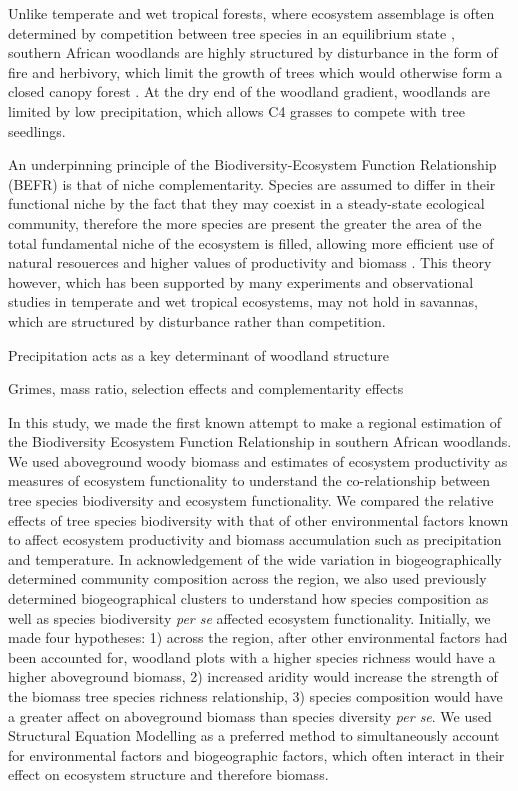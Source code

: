 \documentclass[11pt,a4paper]{article}
\begin{document}
Unlike temperate and wet tropical forests, where ecosystem assemblage is often determined by competition between tree species in an equilibrium state \citep{}, southern African woodlands are highly structured by disturbance in the form of fire and herbivory, which limit the growth of trees which would otherwise form a closed canopy forest \citep{}. At the dry end of the woodland gradient, woodlands are limited by low precipitation, which allows C4 grasses to compete with tree seedlings.

An underpinning principle of the Biodiversity-Ecosystem Function Relationship (BEFR) is that of niche complementarity. Species are assumed to differ in their functional niche by the fact that they may coexist in a steady-state ecological community, therefore the more species are present the greater the area of the total fundamental niche of the ecosystem is filled, allowing more efficient use of natural resouerces and higher values of productivity and biomass \citep{}. This theory however, which has been supported by many experiments and observational studies in temperate and wet tropical ecosystems, may not hold in savannas, which are structured by disturbance rather than competition.

Precipitation acts as a key determinant of woodland structure

Grimes, mass ratio, selection effects and complementarity effects 

In this study, we made the first known attempt to make a regional estimation of the Biodiversity Ecosystem Function Relationship in southern African woodlands. We used aboveground woody biomass and estimates of ecosystem productivity as measures of ecosystem functionality to understand the co-relationship between tree species biodiversity and ecosystem functionality. We compared the relative effects of tree species biodiversity with that of other environmental factors known to affect ecosystem productivity and biomass accumulation such as precipitation and temperature. In acknowledgement of the wide variation in biogeographically determined community composition across the region, we also used previously determined biogeographical clusters \citep{} to understand how species composition as well as species biodiversity \textit{per se} affected ecosystem functionality. Initially, we made four hypotheses: 1) across the region, after other environmental factors had been accounted for, woodland plots with a higher species richness would have a higher aboveground biomass, 2) increased aridity would increase the strength of the biomass tree species richness relationship, 3) species composition would have a greater affect on aboveground biomass than species diversity \textit{per se}. We used Structural Equation Modelling as a preferred method to simultaneously account for environmental factors and biogeographic factors, which often interact in their effect on ecosystem structure and therefore biomass. 
\end{document}
